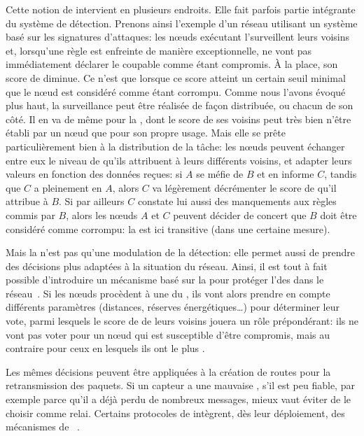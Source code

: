 Cette notion de  intervient en plusieurs endroits.
Elle fait parfois partie intégrante du système de détection.
Prenons ainsi l'exemple d'un réseau utilisant un système basé sur les signatures d'attaques: les nœuds exécutant l'\IDS surveillent leurs voisins et, lorsqu'une règle est enfreinte de manière exceptionnelle, ne vont pas immédiatement déclarer le coupable comme étant compromis.
À la place, son score de \reput diminue.
Ce n'est que lorsque ce score atteint un certain seuil minimal que le nœud est considéré comme étant corrompu.
Comme nous l'avons évoqué plus haut, la surveillance peut être réalisée de façon distribuée, ou chacun de son côté.
Il en va de même pour la \reput, dont le score de ses voisins peut très bien n'être établi par un nœud que pour son propre usage.
Mais elle se prête particulièrement bien à la distribution de la tâche: les nœuds peuvent échanger entre eux le niveau de  qu'ils attribuent à leurs différents voisins, et adapter leurs valeurs en fonction des données reçues: si $A$ se méfie de $B$ et en informe $C$, tandis que $C$ a pleinement  en $A$, alors $C$ va légèrement décrémenter le score de \reput qu'il attribue à $B$.
Si par ailleurs $C$ constate lui aussi des manquements aux règles commis par $B$, alors les nœuds $A$ et $C$ peuvent décider de concert que $B$ doit être considéré comme corrompu: la  est ici transitive (dans une certaine mesure).

Mais la  n'est pas qu'une modulation de la détection: elle permet aussi de prendre des décisions plus adaptées à la situation du réseau.
Ainsi, il est tout à fait possible d'introduire un mécanisme basé sur la  pour protéger l'\election des \chs dans le réseau~\cite{CPG06}.
Si les nœuds procèdent à une \election du \CH, ils vont alors prendre en compte différents paramètres (distances, réserves énergétiques\dots) pour déterminer leur vote, parmi lesquels le score de \reput de leurs voisins jouera un rôle prépondérant: ils ne vont pas voter pour un nœud qui est susceptible d'être compromis, mais au contraire pour ceux en lesquels ils ont le plus .

Les mêmes décisions peuvent être appliquées à la création de routes pour la retransmission des paquets.
Si un capteur a une mauvaise \reput, \cad s'il est peu fiable, par exemple parce qu'il a déjà perdu de nombreux messages, mieux vaut éviter de le choisir comme relai.
Certains protocoles de  intègrent, dès leur déploiement, des mécanismes de ~\cite{ZTLMK13}.

